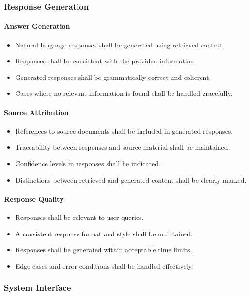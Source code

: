 \documentclass[12pt,a4paper]{report}
\begin{document}
\subsubsection{Response Generation}
\paragraph{Answer Generation}
\begin{itemize}
    \item Natural language responses shall be generated using retrieved context.
    \item Responses shall be consistent with the provided information.
    \item Generated responses shall be grammatically correct and coherent.
    \item Cases where no relevant information is found shall be handled gracefully.
\end{itemize}

\paragraph{Source Attribution}
\begin{itemize}
    \item References to source documents shall be included in generated responses.
    \item Traceability between responses and source material shall be maintained.
    \item Confidence levels in responses shall be indicated.
    \item Distinctions between retrieved and generated content shall be clearly marked.
\end{itemize}

\paragraph{Response Quality}
\begin{itemize}
    \item Responses shall be relevant to user queries.
    \item A consistent response format and style shall be maintained.
    \item Responses shall be generated within acceptable time limits.
    \item Edge cases and error conditions shall be handled effectively.
\end{itemize}

\subsubsection{System Interface}
\end{document}
